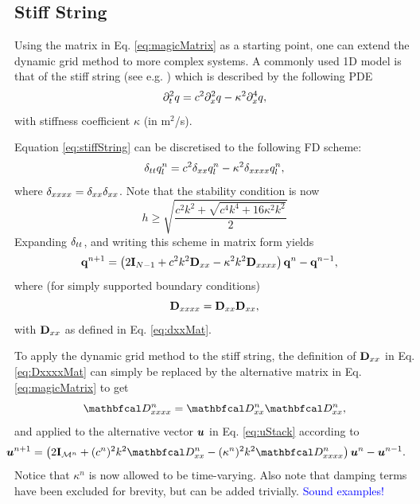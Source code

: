 \documentclass[fleqn]{jaes}
\def\SWcomment[#1]{\textcolor{blue}{#1}}
\begin{document}
\subsection{Stiff String}\label{sec:stiffString}
Using the matrix in Eq. \eqref{eq:magicMatrix} as a starting point, one can extend the dynamic grid method to more complex systems. A commonly used 1D model is that of the stiff string (see e.g. \cite{Webb2015, Bilbao2019, Willemsen2019}) which is described by the following PDE \cite{Bilbao2009}
\begin{equation}\label{eq:stiffString}
    \ptt q = c^2 \pxx q - \kappa^2 \pxxxx q,
\end{equation} 
with stiffness coefficient $\kappa$ (in m$^2$/s).

Equation \eqref{eq:stiffString} can be discretised to the following FD scheme:
\begin{equation}
    \delta_{tt} q_l^n = c^2 \delta_{xx} q_l^n - \kappa^2 \delta_{xxxx} q_l^n,
\end{equation}
where $\delta_{xxxx} = \delta_{xx}\delta_{xx}$. Note that the stability condition is now
\begin{equation}
    h \geq \sqrt{\frac{c^2k^2 + \sqrt{c^4k^4+16\kappa^2k^2}}{2}}
\end{equation} 
Expanding $\delta_{tt}$, and writing this scheme in matrix form yields
\begin{equation}
    \!\!\!\!\!\!\mathbf{q}^{n+1} = \left(2\mathbf{I}_{N-1} + c^2 k^2 \mathbf{D}_{xx} - \kappa^2 k^2 \mathbf{D}_{xxxx}\right)\mathbf{q}^{n} - \mathbf{q}^{n-1},
\end{equation}
where (for simply supported boundary conditions)
\begin{equation}\label{eq:DxxxxMat}
    \Dxxxx = \Dxx\Dxx,
\end{equation}
with $\mathbf{D}_{xx}$ as defined in Eq. \eqref{eq:dxxMat}.

To apply the dynamic grid method to the stiff string, the definition of $\mathbf{D}_{xx}$ in Eq. \eqref{eq:DxxxxMat} can simply be replaced by the alternative matrix in Eq. \eqref{eq:magicMatrix} to get
\begin{equation}
    \DDxxxx = \DDxx\DDxx,
\end{equation}
and applied to the alternative vector $\boldsymbol{u}$ in Eq. \eqref{eq:uStack} according to
\begin{equation}
    \!\!\!\!\!\!\!\!\!\uStack^{n+1} = \left(2\I_\MoneD + (c^n)^2k^2\DDxx - (\kappa^n)^2k^2\DDxxxx\right)\uStack^n - \uStack^{n-1}.
\end{equation}
Notice that $\kappa^n$ is now allowed to be time-varying. Also note that damping terms have been excluded for brevity, but can be added trivially. 
\SWcomment[Sound examples!]
\end{document}
